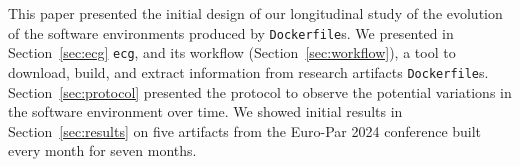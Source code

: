 \documentclass[sigconf,natbib=false]{acmart}
\newcommand{\ie}{\emph{i.e.,}}
\newcommand{\df}{\texttt{Dockerfile}}
\newcommand{\ecg}{\texttt{ecg}}
\begin{document}
% 
% 
% 
% 
% 
% 


This paper presented the initial design of our longitudinal study of the evolution of the software environments produced by \df s.
We presented in Section~\ref{sec:ecg} \ecg, and its workflow (Section~\ref{sec:workflow}), a tool to download, build, and extract information from research artifacts \df s.
Section~\ref{sec:protocol} presented the protocol to observe the potential variations in the software environment over time.
We showed initial results in Section~\ref{sec:results} on five artifacts from the Euro-Par 2024 conference built every month for seven months.
\end{document}
